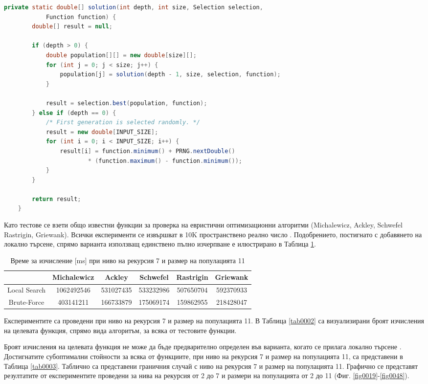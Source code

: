 \begin{lstlisting}[caption=Йерархична селекция, language=Java, basicstyle=\tiny, label=list0013]
	private static double[] solution(int depth, int size, Selection selection,
			Function function) {
		double[] result = null;

		if (depth > 0) {
			double population[][] = new double[size][];
			for (int j = 0; j < size; j++) {
				population[j] = solution(depth - 1, size, selection, function);
			}

			result = selection.best(population, function);
		} else if (depth == 0) {
			/* First generation is selected randomly. */
			result = new double[INPUT_SIZE];
			for (int i = 0; i < INPUT_SIZE; i++) {
				result[i] = function.minimum() + PRNG.nextDouble()
						* (function.maximum() - function.minimum());
			}
		}

		return result;
	}
\end{lstlisting}

Като тестове се взети общо известни функции за проверка на евристични оптимизационни алгоритми (Michalewicz, Ackley, Schwefel Rastrigin, Griewank). Всички експерименти се извършват в 10K пространствено реално число \cite{Tomov-01}. Подобрението, постигнато с добавянето на локално търсене, спрямо варианта използващ единствено пълно изчерпване е илюстрирано в Таблица \ref{tab0001}.

\begin{table}[h!]
\begin{tabular}{ | c | c | c | c | c | c | }
\hline
& \cellcolor{gray!15}Michalewicz & \cellcolor{gray!15}Ackley & \cellcolor{gray!15}Schwefel & \cellcolor{gray!15}Rastrigin & \cellcolor{gray!15}Griewank \\ [0.05ex] 
\hline
\hline
Local Search & 1062492546 & 531027435 & 533232986 & 507650704 & 592370933 \\  
\hline
Brute-Force & 403141211 & 166733879 & 175069174 & 159862955 & 218428047 \\  
\hline
\end{tabular}
\caption{Време за изчисление [ms] при ниво на рекурсия 7 и размер на популацията 11}
\label{tab0001}
\end{table}

Експериментите са проведени при ниво на рекурсия 7 и размер на популацията 11. В Таблица \ref{tab0002} са визуализирани броят изчисления на целевата функция, спрямо вида алгоритъм, за всяка от тестовите функции. 

Броят изчисления на целевата функция не може да бъде предварително определен във варианта, когато се прилага локално търсене \cite{Tomov-02}. Достигнатите субоптимални стойности за всяка от функциите, при ниво на рекурсия 7 и размер на популацията 11, са представени в Таблица \ref{tab0003}. Таблично са представени граничния случай с ниво на рекурсия 7 и размер на популацията 11. Графично се представят резултатите от експериментите проведени за нива на рекурсия от 2 до 7 и размери на популацията от 2 до 11 (Фиг. \ref{fig0019}-\ref{fig0048}).

